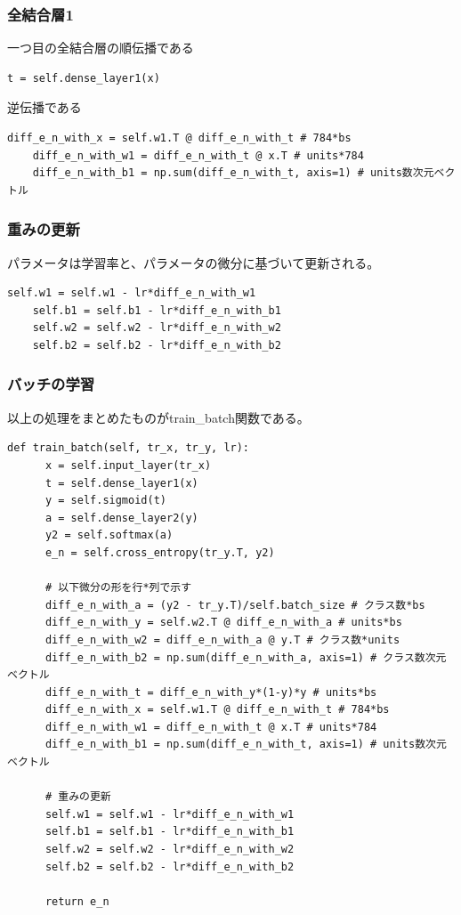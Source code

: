 \documentclass[platex,dvipdfmx]{jsarticle}
\begin{document}
  \subsubsection{全結合層1}

  一つ目の全結合層の順伝播である

  \begin{lstlisting}[caption=ex3.py, label=dense1_fwd]
    t = self.dense_layer1(x)
  \end{lstlisting}

  逆伝播である

  \begin{lstlisting}[caption=ex3.py, label=dense1_bwd]
    diff_e_n_with_x = self.w1.T @ diff_e_n_with_t # 784*bs
    diff_e_n_with_w1 = diff_e_n_with_t @ x.T # units*784
    diff_e_n_with_b1 = np.sum(diff_e_n_with_t, axis=1) # units数次元ベクトル
  \end{lstlisting}

  \subsubsection{重みの更新}

  パラメータは学習率と、パラメータの微分に基づいて更新される。

  \begin{lstlisting}[caption=ex3.py, label=update]
    self.w1 = self.w1 - lr*diff_e_n_with_w1
    self.b1 = self.b1 - lr*diff_e_n_with_b1
    self.w2 = self.w2 - lr*diff_e_n_with_w2
    self.b2 = self.b2 - lr*diff_e_n_with_b2
  \end{lstlisting}

  \subsubsection{バッチの学習}

  以上の処理をまとめたものがtrain\_batch関数である。

  \begin{lstlisting}[caption=ex3.py, label=train_batch]
    def train_batch(self, tr_x, tr_y, lr):
      x = self.input_layer(tr_x)
      t = self.dense_layer1(x)
      y = self.sigmoid(t)
      a = self.dense_layer2(y)
      y2 = self.softmax(a)
      e_n = self.cross_entropy(tr_y.T, y2)

      # 以下微分の形を行*列で示す
      diff_e_n_with_a = (y2 - tr_y.T)/self.batch_size # クラス数*bs
      diff_e_n_with_y = self.w2.T @ diff_e_n_with_a # units*bs
      diff_e_n_with_w2 = diff_e_n_with_a @ y.T # クラス数*units
      diff_e_n_with_b2 = np.sum(diff_e_n_with_a, axis=1) # クラス数次元ベクトル
      diff_e_n_with_t = diff_e_n_with_y*(1-y)*y # units*bs
      diff_e_n_with_x = self.w1.T @ diff_e_n_with_t # 784*bs
      diff_e_n_with_w1 = diff_e_n_with_t @ x.T # units*784
      diff_e_n_with_b1 = np.sum(diff_e_n_with_t, axis=1) # units数次元ベクトル

      # 重みの更新
      self.w1 = self.w1 - lr*diff_e_n_with_w1
      self.b1 = self.b1 - lr*diff_e_n_with_b1
      self.w2 = self.w2 - lr*diff_e_n_with_w2
      self.b2 = self.b2 - lr*diff_e_n_with_b2

      return e_n
  \end{lstlisting}
\end{document}
